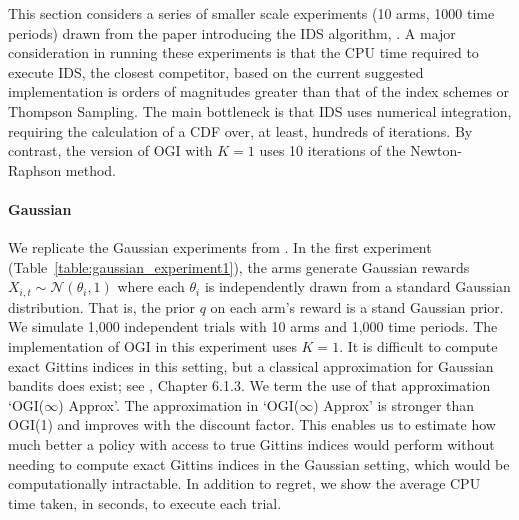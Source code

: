 This section considers a series of smaller scale experiments (10 arms, 1000 time periods) drawn from the paper introducing the IDS algorithm, \citep{russo2014learning}. A major consideration in running these experiments is that the CPU time required to execute IDS, the closest competitor, based on the current suggested implementation is orders of magnitudes greater than that of the index schemes or Thompson Sampling. The main bottleneck is that IDS uses numerical integration, requiring the calculation of a CDF over, at least, hundreds of iterations. By contrast, the version of OGI with $K=1$ uses 10 iterations of the Newton-Raphson method. 

\paragraph{Gaussian}We replicate the Gaussian experiments from \cite{russo2014learning}. In the first experiment (Table~\ref{table:gaussian_experiment1}), the arms generate Gaussian rewards  $X_{i,t} \sim \mathcal{N}(\theta_i, 1)$ where each $\theta_i$ is independently drawn from a standard Gaussian distribution. {That is, the prior $q$ on each arm's reward is a stand Gaussian prior.} We simulate 1,000 independent trials with 10 arms and 1,000 time periods. The implementation of OGI in this experiment uses $K = 1$. It is difficult to compute exact Gittins indices in this setting, but a classical approximation for Gaussian bandits does exist; see \cite{powell2012optimal}, Chapter 6.1.3. We term the use of that approximation `OGI($\infty$) Approx'. {\color{blue}The approximation in `OGI($\infty$) Approx' is stronger than OGI(1) and improves with the discount factor. This enables us to estimate how much better a policy with access to true Gittins indices would perform without needing to compute exact Gittins indices in the Gaussian setting, which would be computationally intractable.}  In addition to regret, we  show the average CPU time taken, in seconds, to execute each trial.

